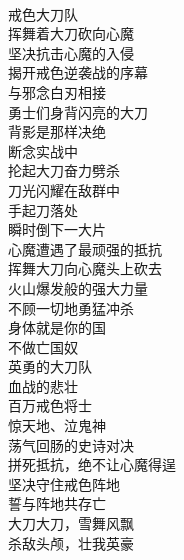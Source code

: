 \begin{poem}[戒色喜峰口]
    \begin{multicols}{3}
        \centering~\\
        戒色大刀队 \\ 挥舞着大刀砍向心魔 \\ 坚决抗击心魔的入侵 \\ 揭开戒色逆袭战的序幕 \\ 与邪念白刃相接 \\ 勇士们身背闪亮的大刀 \\ 背影是那样决绝 \\ 断念实战中 \\ 抡起大刀奋力劈杀 \\ 刀光闪耀在敌群中 \\ 手起刀落处 \\ 瞬时倒下一大片 \\ 心魔遭遇了最顽强的抵抗 \\ 挥舞大刀向心魔头上砍去 \\ 火山爆发般的强大力量 \\ 不顾一切地勇猛冲杀 \\ 身体就是你的国 \\ 不做亡国奴 \\ 英勇的大刀队 \\ 血战的悲壮 \\ 百万戒色将士 \\ 惊天地、泣鬼神 \\ 荡气回肠的史诗对决 \\ 拼死抵抗，绝不让心魔得逞 \\ 坚决守住戒色阵地 \\ 誓与阵地共存亡 \\ 大刀大刀，雪舞风飘 \\ 杀敌头颅，壮我英豪
    \end{multicols}
\end{poem}


